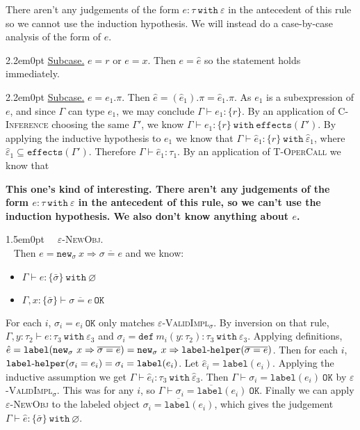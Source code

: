 \documentclass{llncs}
\newcommand{\keywadj}[1]{\mathtt{#1}}
\newcommand{\keyw}[1]{\keywadj{#1}~}
\newcommand{\hyphen}{\hbox{-}}
\newcommand{\proofcase}[2]{
	\begin{adjustwidth}{1.5em}{0pt}
		\fbox{Case.}~~#1. \\ ~#2
	\end{adjustwidth}
}
\newcommand{\subcase}[1] {
	\begin{adjustwidth}{2.2em}{0pt}
		\underline{Subcase.} #1
	\end{adjustwidth}
}
\newcommand{\type}[2]{
	#1~\keyw{with} #2
}
\newcommand{\newsig}[0]{
	\keywadj{new}_\sigma~x \Rightarrow \overline{\sigma = e}
}
\begin{document}
{{There aren't any judgements of the form $e : \tau~\keyw{with} \varepsilon$ in the antecedent of this rule so we cannot use the induction hypothesis. We will instead do a case-by-case analysis of the form of $e$.

\subcase{$e = r$ or $e = x$.
Then $e = \hat e$ so the statement holds immediately.
}

\subcase{$e = e_1.\pi$.
Then $\hat e = (\hat e_1).\pi = \hat e_1.\pi$. As $e_1$ is a subexpression of $e$, and since $\Gamma$ can type $e_1$, we may conclude $\Gamma \vdash e_1 : \{ r \}$. By an application of \textsc{C-Inference} choosing the same $\Gamma' $, we know $\Gamma \vdash e_1 : \{ r \}~\keyw{with} \keywadj{effects}(\Gamma')$. By applying the inductive hypothesis to $e_1$ we know that $\Gamma \vdash \hat e_1 : \{ r \}~\keyw{with} \hat \varepsilon_1$, where $\hat \varepsilon_1 \subseteq \keywadj{effects}(\Gamma')$. Therefore $\Gamma \vdash \hat e_1 : \tau_1$. By an application of \textsc{T-OperCall} we know that
}

	\textbf{This one's kind of interesting. There aren't any judgements of the form $e : \tau~\keyw{with} \varepsilon$ in the antecedent of this rule, so we can't use the induction hypothesis. We also don't know anything about $e$.\\}
}
	
\proofcase{\textsc{$\varepsilon$-NewObj}}{
Then $e = \newsig$ and we know:
\begin{itemize}
	\item $\Gamma \vdash e : \type{ \{ \bar \sigma \} }{\varnothing}$
	\item $\Gamma, x : \{ \bar \sigma \} \vdash \overline{ \sigma = e }~\keyw{OK}$
\end{itemize}
For each $i$, $\sigma_i = e_i~\keywadj{OK}$ only matches \textsc{$\varepsilon$-ValidImpl$_\sigma$}. By inversion on that rule, $\Gamma, y : \tau_2 \vdash e: \tau_3~\keyw{with} \varepsilon_3$ and $\sigma_i = \keyw{def} m_i(y : \tau_2) : \tau_3~\keyw{with} \varepsilon_3$. Applying definitions, $\hat e = \keywadj{label}(\newsig) = \keywadj{new}_\sigma~x \Rightarrow \keywadj{label \hyphen helper}(\overline{\sigma = e})$. Then for each $i$, 
 $\keywadj{label \hyphen helper}(\sigma_i = e _i) = \sigma_i = \keywadj{label}(e_i)$. Let $\hat e_i = \keywadj{label}(e_i)$. Applying the inductive assumption we get $\Gamma \vdash \hat e_i : \type{\tau_3}{\hat \varepsilon_3}$. Then $\Gamma \vdash \sigma_i = \keywadj{label}(e_i)~\keywadj{OK}$ by \textsc{$\varepsilon$-ValidImpl$_\sigma$}. This was for any $i$, so $\Gamma \vdash \overline{ \sigma_i = \keywadj{label}(e_i) }~\keywadj{OK}$. Finally we can apply \textsc{$\varepsilon$-NewObj} to the labeled object $\overline{ \sigma_i = \keywadj{label}(e_i) }$, which gives the judgement $\Gamma \vdash \hat e : \{ \bar \sigma \}~\keyw{with} \varnothing$.\\
}

}
\end{document}
